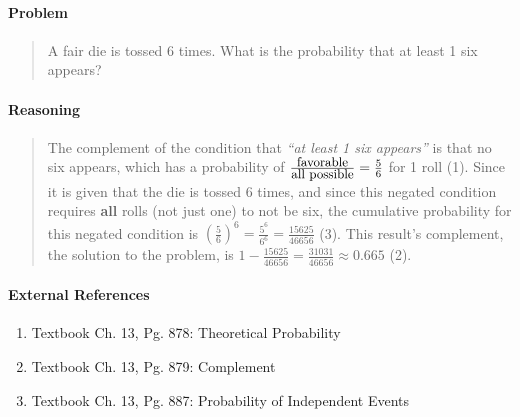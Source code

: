 \documentclass[letterpaper,12pt,twoside]{report}
\begin{document}
	\pagestyle{fancy}
	\fancyhf{}
	
	\paragraph{Problem}
	\begin{quote}
	\textsf{A fair die is tossed 6 times. What is the probability that at least 1 six appears?}
	\end{quote}
	
	\begin{center}
		\begin{tikzpicture}
		\end{tikzpicture}
	\end{center}
	
	\paragraph{Reasoning}
	\begin{quotation}
	
	The complement of the condition that \textit{``at least 1 six appears''} is that no six appears, which has a probability of $\frac{\textrm{\small{favorable}}}{\textrm{\small{all possible}}} = \frac{5}{6}$ for 1 roll (1). Since it is given that the die is tossed 6 times, and since this negated condition requires \textbf{all} rolls (not just one) to not be six, the cumulative probability for this negated condition is $(\frac{5}{6})^6 = \frac{5^6}{6^6} = \frac{15625}{46656}$ (3). This result's complement, the solution to the problem, is $1-\frac{15625}{46656} = \boxed{\frac{31031}{46656} \approx 0.665}$ (2).
	
	\end{quotation}
	
	\paragraph{External References}
	
	\begin{enumerate}
		\item Textbook Ch. 13, Pg. 878: Theoretical Probability
		\item Textbook Ch. 13, Pg. 879: Complement
		\item Textbook Ch. 13, Pg. 887: Probability of Independent Events
	\end{enumerate}
\end{document}

